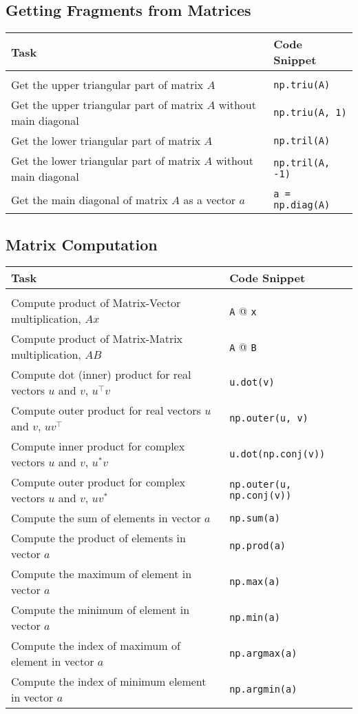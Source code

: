 \documentclass[a4paper,11pt]{article}
\begin{document}
\subsection*{Getting Fragments from Matrices}
\begin{tabular}{p{9cm} | p{5cm}}
  Task & Code Snippet \\
  \hline \\
  Get the upper triangular part of matrix $A$ &  \texttt{np.triu(A)} \\
  Get the upper triangular part of matrix $A$ without main diagonal&  \texttt{np.triu(A, 1)} \\
  Get the lower triangular part of matrix $A$ &  \texttt{np.tril(A)}\\
  Get the lower triangular part of matrix $A$ without main diagonal &  \texttt{np.tril(A, -1)} \\
  Get the main diagonal of matrix $A$ as a vector $a$  &  \texttt{a = np.diag(A)} \\
\end{tabular}
\subsection*{Matrix Computation}
\begin{tabular}{p{10cm} |p{5cm}}
  Task & Code Snippet \\
  \hline \\
  Compute product of Matrix-Vector multiplication, $Ax$ & \texttt{A} @ \texttt{x}  \\
  Compute product of Matrix-Matrix multiplication, $AB$ & \texttt{A} @ \texttt{B}  \\
  Compute dot (inner) product for real vectors $u$ and $v$, $u^{\top}v$ &  \texttt{u.dot(v)}\\
  Compute outer product for real vectors $u$ and  $v$,  $uv^{\top}$ & \texttt{np.outer(u, v)}\\
  Compute inner product for complex vectors $u$ and  $v$, $u^{*}v$ & \texttt{u.dot(np.conj(v))} \\
  Compute outer product for complex vectors $u$ and  $v$,  $uv^{*}$ & \texttt{np.outer(u, np.conj(v))}\\
  Compute the sum of elements in vector \(a\) & \texttt{np.sum(a)} \\
  Compute the product of elements in vector \(a\) & \texttt{np.prod(a)} \\
  Compute the maximum of element in vector \(a\) & \texttt{np.max(a)} \\
  Compute the minimum of element in vector \(a\) & \texttt{np.min(a)} \\
  Compute the index of maximum of element in vector \(a\) & \texttt{np.argmax(a)} \\
  Compute the index of minimum element in vector \(a\) & \texttt{np.argmin(a)} \\
\end{tabular}
\newpage
\end{document}
